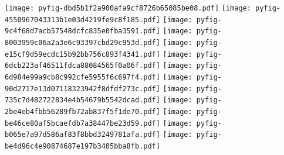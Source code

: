 \documentclass{report}
\begin{document}
\texttt{[image: pyfig-dbd5b1f2a900afa9cf8726b65085be08.pdf]}
\clearpage%
\texttt{[image: pyfig-4550967043313b1e03d4219fe9c8f185.pdf]}
\clearpage%
\texttt{[image: pyfig-9c4f68d7acb57548dcfc835e0fba3591.pdf]}
\clearpage%
\texttt{[image: pyfig-8003959c06a2a3e6c93397cbd29c953d.pdf]}
\clearpage%
\texttt{[image: pyfig-e15cf9d59ecdc15b92bb756c893f4341.pdf]}
\clearpage%
\texttt{[image: pyfig-6dcb223af46511fdca88084565f0a06f.pdf]}
\clearpage%
\texttt{[image: pyfig-6d984e99a9cb8c992cfe5955f6c697f4.pdf]}
\clearpage%
\texttt{[image: pyfig-90d2717e13d07118323942f8dfdf273c.pdf]}
\clearpage%
\texttt{[image: pyfig-735c7d482722834e4b54679b5542dcad.pdf]}
\clearpage%
\texttt{[image: pyfig-2be4eb4fbb56289fb72ab837f5f1de70.pdf]}
\clearpage%
\texttt{[image: pyfig-be46ce80af5bcaefdb7a38447be23d59.pdf]}
\clearpage%
\texttt{[image: pyfig-b065e7a97d586af83f8bbd3249781afa.pdf]}
\clearpage%
\texttt{[image: pyfig-be4d96c4e90874687e197b3405bba8fb.pdf]}
\clearpage%
\end{document}
